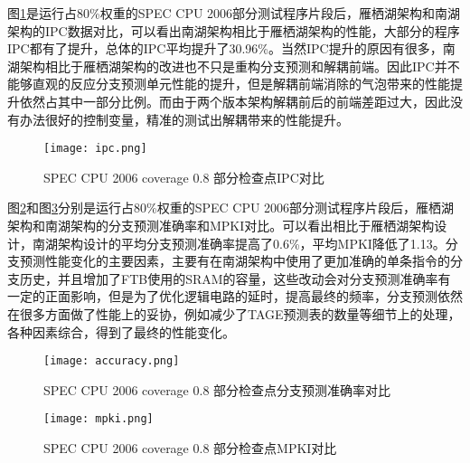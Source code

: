 图\ref{fig:figure61}是运行占80\%权重的SPEC CPU 2006部分测试程序片段后，雁栖湖架构和南湖架构的IPC数据对比，可以看出南湖架构相比于雁栖湖架构的性能，大部分的程序IPC都有了提升，总体的IPC平均提升了30.96\%。当然IPC提升的原因有很多，南湖架构相比于雁栖湖架构的改进也不只是重构分支预测和解耦前端。因此IPC并不能够直观的反应分支预测单元性能的提升，但是解耦前端消除的气泡带来的性能提升依然占其中一部分比例。而由于两个版本架构解耦前后的前端差距过大，因此没有办法很好的控制变量，精准的测试出解耦带来的性能提升。


\begin{figure}[H]
	\centering
	\setlength\tabcolsep{3pt}  %
	\vspace{5pt} %
	\texttt{[image: ipc.png]}
	\caption{SPEC CPU 2006 coverage 0.8 部分检查点IPC对比}
	\label{fig:figure61}
\end{figure}

图\ref{fig:figure64}和图\ref{fig:figure62}分别是运行占80\%权重的SPEC CPU 2006部分测试程序片段后，雁栖湖架构和南湖架构的分支预测准确率和MPKI对比。可以看出相比于雁栖湖架构设计，南湖架构设计的平均分支预测准确率提高了0.6\%，平均MPKI降低了1.13。分支预测性能变化的主要因素，主要有在南湖架构中使用了更加准确的单条指令的分支历史，并且增加了FTB使用的SRAM的容量，这些改动会对分支预测准确率有一定的正面影响，但是为了优化逻辑电路的延时，提高最终的频率，分支预测依然在很多方面做了性能上的妥协，例如减少了TAGE预测表的数量等细节上的处理，各种因素综合，得到了最终的性能变化。

\begin{figure}[htb]
	\centering
	\setlength\tabcolsep{3pt}  %
	\vspace{5pt} %
	\texttt{[image: accuracy.png]}
	\caption{SPEC CPU 2006 coverage 0.8 部分检查点分支预测准确率对比}
	\label{fig:figure64}
\end{figure}



\begin{figure}[H]
	\centering
	\setlength\tabcolsep{3pt}  %
	\vspace{5pt} %
	\texttt{[image: mpki.png]}
	\caption{SPEC CPU 2006 coverage 0.8 部分检查点MPKI对比}
	\label{fig:figure62}
\end{figure}

